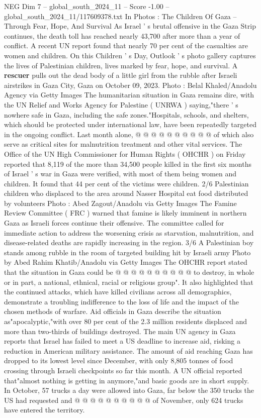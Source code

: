 \begin{textsample}{NEG Dim 7 – global\_south\_2024\_11 – Score -1.00 – global\_south\_2024\_11/117609378.txt}  \label{ex:f7_neg_316}
In Photos : The Children Of Gaza -- Through Fear, Hope, And Survival As Israel ' s brutal offensive in the Gaza Strip continues, the death toll has reached nearly 43,700 after more than a year of conflict.
A recent UN report found that nearly 70 per cent of the casualties are women and children.
On this Children ' s Day, Outlook ' s photo gallery captures the lives of Palestinian children, lives marked by fear, hope, and survival.
A \textbf{rescuer} pulls out the dead body of a little girl from the rubble after Israeli airstrikes in Gaza City, Gaza on October 09, 2023.
Photo : Belal Khaled/Anadolu Agency via Getty Images The humanitarian situation in Gaza remains dire, with the UN Relief and Works Agency for Palestine ( UNRWA ) saying,"there ' s nowhere safe in Gaza, including the safe zones."Hospitals, schools, and shelters, which should be protected under international law, have been repeatedly targeted in the ongoing conflict.
Last month alone, @ @ @ @ @ @ @ @ @ @ of which also serve as critical sites for malnutrition treatment and other vital services.
The Office of the UN High Commissioner for Human Rights ( OHCHR ) on Friday reported that 8,119 of the more than 34,500 people killed in the first six months of Israel ' s war in Gaza were verified, with most of them being women and children.
It found that 44 per cent of the victims were children. 2/6 Palestinian children who displaced to the area around Nasser Hospital eat food distributed by volunteers Photo : Abed Zagout/Anadolu via Getty Images The Famine Review Committee ( FRC ) warned that famine is likely imminent in northern Gaza as Israeli forces continue their offensive.
The committee called for immediate action to address the worsening crisis as starvation, malnutrition, and disease-related deaths are rapidly increasing in the region. 3/6 A Palestinian boy stands among rubble in the room of targeted building hit by Israeli army Photo by Abed Rahim Khatib/Anadolu via Getty Images The OHCHR report stated that the situation in Gaza could be @ @ @ @ @ @ @ @ @ @ to destroy, in whole or in part, a national, ethnical, racial or religious group".
It also highlighted that the continued attacks, which have killed civilians across all demographics, demonstrate a troubling indifference to the loss of life and the impact of the chosen methods of warfare.
Aid officials in Gaza describe the situation as"apocalyptic,"with over 80 per cent of the 2.3 million residents displaced and more than two-thirds of buildings destroyed.
The main UN agency in Gaza reports that Israel has failed to meet a US deadline to increase aid, risking a reduction in American military assistance.
The amount of aid reaching Gaza has dropped to its lowest level since December, with only 8,805 tonnes of food crossing through Israeli checkpoints so far this month.
A UN official reported that"almost nothing is getting in anymore,"and basic goods are in short supply.
In October, 57 trucks a day were allowed into Gaza, far below the 350 trucks the US had requested and @ @ @ @ @ @ @ @ @ @ of November, only 624 trucks have entered the territory.

\end{textsample}

